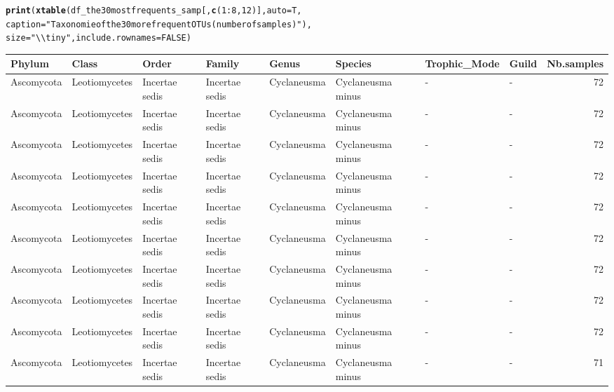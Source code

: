 \documentclass[12pt]{article}\usepackage[]{graphicx}\usepackage[]{color}
\makeatletter
\newcommand{\hlnum}[1]{\textcolor[rgb]{0.686,0.059,0.569}{#1}}%
\newcommand{\hlstr}[1]{\textcolor[rgb]{0.192,0.494,0.8}{#1}}%
\newcommand{\hlopt}[1]{\textcolor[rgb]{0,0,0}{#1}}%
\newcommand{\hlstd}[1]{\textcolor[rgb]{0.345,0.345,0.345}{#1}}%
\newcommand{\hlkwc}[1]{\textcolor[rgb]{0.333,0.667,0.333}{#1}}%
\newcommand{\hlkwd}[1]{\textcolor[rgb]{0.737,0.353,0.396}{\textbf{#1}}}%
\newenvironment{kframe}{%
 \def\at@end@of@kframe{}%
 \ifinner\ifhmode%
  \def\at@end@of@kframe{\end{minipage}}%
  \begin{minipage}{\columnwidth}%
 \fi\fi%
 \def\FrameCommand##1{\hskip\@totalleftmargin \hskip-\fboxsep
 \colorbox{shadecolor}{##1}\hskip-\fboxsep
     \hskip-\linewidth \hskip-\@totalleftmargin \hskip\columnwidth}%
 \MakeFramed {\advance\hsize-\width
   \@totalleftmargin\z@ \linewidth\hsize
   \@setminipage}}%
 {\par\unskip\endMakeFramed%
 \at@end@of@kframe}
\numberwithin{figure}{section}
\makeatother
\begin{document}
\begin{landscape}
\begin{kframe}
\begin{alltt}
\hlkwd{print}\hlstd{(}\hlkwd{xtable}\hlstd{(df_the30mostfrequents_samp[,} \hlkwd{c}\hlstd{(}\hlnum{1}\hlopt{:}\hlnum{8}\hlstd{,} \hlnum{12}\hlstd{)],} \hlkwc{auto} \hlstd{= T,}
      \hlkwc{caption} \hlstd{=} \hlstr{"Taxonomie of the 30 more frequent OTUs (number of samples)"}\hlstd{),}
      \hlkwc{size} \hlstd{=} \hlstr{"\textbackslash{}\textbackslash{}tiny"}\hlstd{,} \hlkwc{include.rownames} \hlstd{=} \hlnum{FALSE}\hlstd{)}
\end{alltt}
\end{kframe}%
\begin{table}[ht]
\centering
\begingroup\tiny
\begin{tabular}{llllllllr}
  \hline
Phylum & Class & Order & Family & Genus & Species & Trophic\_Mode & Guild & Nb.samples \\ 
  \hline
Ascomycota & Leotiomycetes & Incertae sedis & Incertae sedis & Cyclaneusma & Cyclaneusma minus & - & - & 72 \\ 
  Ascomycota & Leotiomycetes & Incertae sedis & Incertae sedis & Cyclaneusma & Cyclaneusma minus & - & - & 72 \\ 
  Ascomycota & Leotiomycetes & Incertae sedis & Incertae sedis & Cyclaneusma & Cyclaneusma minus & - & - & 72 \\ 
  Ascomycota & Leotiomycetes & Incertae sedis & Incertae sedis & Cyclaneusma & Cyclaneusma minus & - & - & 72 \\ 
  Ascomycota & Leotiomycetes & Incertae sedis & Incertae sedis & Cyclaneusma & Cyclaneusma minus & - & - & 72 \\ 
  Ascomycota & Leotiomycetes & Incertae sedis & Incertae sedis & Cyclaneusma & Cyclaneusma minus & - & - & 72 \\ 
  Ascomycota & Leotiomycetes & Incertae sedis & Incertae sedis & Cyclaneusma & Cyclaneusma minus & - & - & 72 \\ 
  Ascomycota & Leotiomycetes & Incertae sedis & Incertae sedis & Cyclaneusma & Cyclaneusma minus & - & - & 72 \\ 
  Ascomycota & Leotiomycetes & Incertae sedis & Incertae sedis & Cyclaneusma & Cyclaneusma minus & - & - & 72 \\ 
  Ascomycota & Leotiomycetes & Incertae sedis & Incertae sedis & Cyclaneusma & Cyclaneusma minus & - & - & 71 \\ 

\end{tabular}
\end{table}
\end{landscape}
\end{document}

